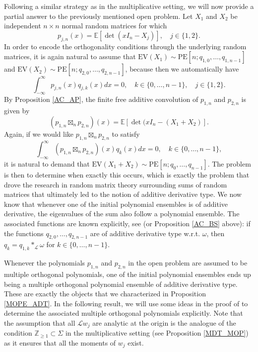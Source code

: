 \documentclass[a4paper,12pt,oneside]{article}
\theoremstyle{definition}
\newcommand{\Z}{\mathbb{Z}}
\newcommand{\om}{\omega}
\newcommand{\LT}[1]{\mathcal{L}#1}
\begin{document}
Following a similar strategy as in the multiplicative setting, we will now provide a partial answer to the previously mentioned open problem. Let $X_1$ and $X_2$ be independent $n\times n$ normal random matrices for which 
    $$ p_{j,n}(x) = \mathbb{E}[\det(xI_n-X_j)],\quad j\in\{1,2\}. $$
In order to encode the orthogonality conditions through the underlying random matrices, it is again natural to assume that $\text{EV}(X_1)\sim \text{PE}[n;q_{1,0},\dots,q_{1,n-1}]$ and $\text{EV}(X_2)\sim \text{PE}[n;q_{2,0},\dots,q_{2,n-1}]$, because then we automatically have
    $$\int_{-\infty}^\infty p_{j,n}(x) q_{j,k}(x) dx = 0,\quad k\in\{0,\dots,n-1\},\quad j\in\{1,2\}.$$
By Proposition \ref{AC_AP}, the finite free additive convolution of $p_{1,n}$ and $p_{2,n}$ is given by
    $$ (p_{1,n}\boxtimes_n p_{2,n})(x) = \mathbb{E}[\det(xI_n-(X_1+X_2)].  $$
Again, if we would like $p_{1,n}\boxtimes_n p_{2,n}$ to satisfy 
    $$\int_{-\infty}^\infty (p_{1,n}\boxtimes_n p_{2,n})(x) q_k(x) dx = 0,\quad k\in\{0,\dots,n-1\},$$
it is natural to demand that $\text{EV}(X_1+X_2)\sim \text{PE}[n;q_0,\dots,q_{n-1}]$. The problem is then to determine when exactly this occurs, which is exactly the problem that drove the research in random matrix theory surrounding sums of random matrices that ultimately led to the notion of additive derivative type. We now know that whenever one of the initial polynomial ensembles is of additive derivative, the eigenvalues of the sum also follow a polynomial ensemble. The associated functions are known explicitly, see \cite[Thm. III.8]{Kieburg:add_conv} (or Proposition \ref{AC_BS} above): if the functions $q_{2,0},\dots,q_{2,n-1}$ are of additive derivative type w.r.t. $\omega$, then $q_k = q_{1,k} \ast_{\LT{}} \om$ for $k\in\{0,\dots,n-1\}$. 
\medbreak

Whenever the polynomials $p_{1,n}$ and $p_{2,n}$ in the open problem are assumed to be multiple orthogonal polynomials, one of the initial polynomial ensembles ends up being a multiple orthogonal polynomial ensemble of additive derivative type. These are exactly the objects that we characterized in Proposition \ref{MOPE_ADT}. In the following result, we will use some ideas in the proof of \cite[Thm. III.1]{Kieburg:add_conv} to determine the associated multiple orthogonal polynomials explicitly. Note that the assumption that all $\LT{w_j}$ are analytic at the origin is the analogue of the condition $\Z_{\geq 1}\subset\Sigma$ in the multiplicative setting (see Proposition \ref{MDT_MOP}) as it ensures that all the moments of $w_j$ exist.
\end{document}
